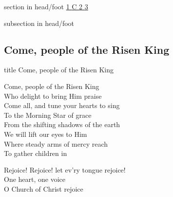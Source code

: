 \documentclass[aspectratio=169]{beamer}
\begin{document}
{
{ 
 {
 \begin{beamercolorbox}[ht=4.5ex,dp=1.5ex,%
      leftskip=.3cm,rightskip=.3cm plus1fil]{section in head/foot}
 \fontsize{12}{25}\selectfont 
\hyperlink{Come, people of the Risen King[]1}{1  }\hyperlink{Come, people of the Risen King[]C}{C  }\hyperlink{Come, people of the Risen King[]2}{2  }\hyperlink{Come, people of the Risen King[]3}{3  } 
 \end{beamercolorbox}%
  \begin{beamercolorbox}[ht=2.5ex,dp=1.125ex,%
   leftskip=.3cm,rightskip=.3cm plus1fil]{subsection in head/foot}
   \insertauthor
 \end{beamercolorbox}%
 }
}
\subsection{Come, people of the Risen King}
\hypertarget{Come, people of the Risen King[]}{}
\begin{frame}{}
 \vfill
  \centering
  \begin{beamercolorbox}[sep=8pt,center,shadow=true,rounded=true]{title}
    Come, people of the Risen King     
  \end{beamercolorbox}
  \vfill
\end{frame}

\hypertarget{Come, people of the Risen King[]1}{}
\begin{frame}{}
\fontsize{18.75}{22.5}\selectfont

Come, people of the Risen King\\ 
Who delight to bring Him praise\\ 
Come all, and tune your hearts to sing\\ 
To the Morning Star of grace\\ 
From the shifting shadows of the earth\\ 
We will lift our eyes to Him\\ 
Where steady arms of mercy reach\\ 
To gather children in

\end{frame}
\hypertarget{Come, people of the Risen King[]C}{}
\begin{frame}{}
\fontsize{18.75}{22.5}\selectfont

Rejoice! Rejoice! let ev'ry tongue rejoice!\\ 
One heart, one voice\\ 
O Church of Christ rejoice


\end{frame}}
\end{document}
